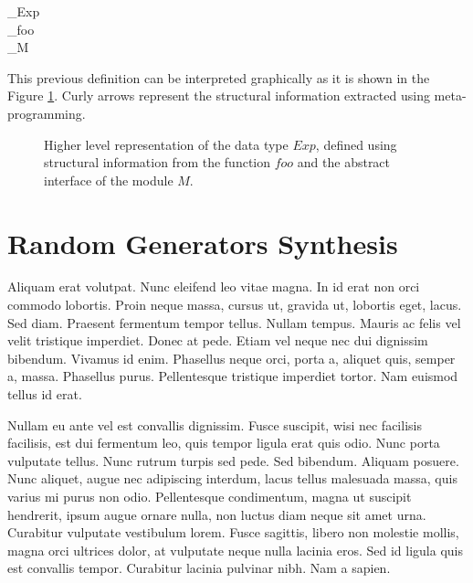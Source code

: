 \documentclass[conference, fleqn]{IEEEtran}
\newcommand{\Conid}[1]{\mathit{#1}}
\newcommand{\Varid}[1]{\mathit{#1}}
\def\resethooks{%
  \global\let\SaveRestoreHook\empty
  \global\let\ColumnHook\empty}
\let\hspre\empty
\let\hspost\empty
\begin{document}
\begin{hscode}\SaveRestoreHook
\column{B}{@{}>{\hspre}l<{\hspost}@{}}%
\column{12}{@{}>{\hspre}l<{\hspost}@{}}%
\column{20}{@{}>{\hspre}l<{\hspost}@{}}%
\column{30}{@{}>{\hspre}l<{\hspost}@{}}%
\column{E}{@{}>{\hspre}l<{\hspost}@{}}%
\>[B]{}\;\Conid{Spec}{}\<[12]%
\>[12]{}\mathrel{=}{}\<[20]%
\>[20]{}_{Exp}\;{}\<[30]%
\>[30]{}\otimes\;\<[E]%
\\
\>[12]{}\!\;\oplus\;{}\<[20]%
\>[20]{}_{foo}\;{}\<[30]%
\>[30]{}\otimes\;\<[E]%
\\
\>[12]{}\!\;\oplus\;{}\<[20]%
\>[20]{}_{M}{}\<[E]%
\ColumnHook
\end{hscode}\resethooks

This previous definition can be interpreted graphically as it is shown in the
Figure \ref{fig:hrep}.
%
Curly arrows represent the structural information extracted using
meta-programming.

\begin{figure}[t]
  \centering
  
  \caption{Higher level representation of the data type \ensuremath{\Conid{Exp}}, defined using
    structural information from the function \ensuremath{\Varid{foo}} and the abstract interface of
    the module \ensuremath{\Conid{M}}.}
  \label{fig:hrep}
\end{figure}


\section{Random Generators Synthesis} \label{sec:synthesis}

Aliquam erat volutpat. Nunc eleifend leo vitae magna. In id erat non orci
commodo lobortis. Proin neque massa, cursus ut, gravida ut, lobortis eget,
lacus. Sed diam. Praesent fermentum tempor tellus. Nullam tempus. Mauris ac
felis vel velit tristique imperdiet. Donec at pede. Etiam vel neque nec dui
dignissim bibendum. Vivamus id enim. Phasellus neque orci, porta a, aliquet
quis, semper a, massa. Phasellus purus. Pellentesque tristique imperdiet tortor.
Nam euismod tellus id erat.

Nullam eu ante vel est convallis dignissim. Fusce suscipit, wisi nec facilisis
facilisis, est dui fermentum leo, quis tempor ligula erat quis odio. Nunc porta
vulputate tellus. Nunc rutrum turpis sed pede. Sed bibendum. Aliquam posuere.
Nunc aliquet, augue nec adipiscing interdum, lacus tellus malesuada massa, quis
varius mi purus non odio. Pellentesque condimentum, magna ut suscipit hendrerit,
ipsum augue ornare nulla, non luctus diam neque sit amet urna. Curabitur
vulputate vestibulum lorem. Fusce sagittis, libero non molestie mollis, magna
orci ultrices dolor, at vulputate neque nulla lacinia eros. Sed id ligula quis
est convallis tempor. Curabitur lacinia pulvinar nibh. Nam a sapien.
\end{document}

